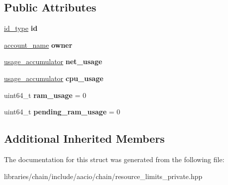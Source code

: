 \subsection*{Public Attributes}
\begin{DoxyCompactItemize}
\item 
\mbox{\label{structaacio_1_1chain_1_1resource__limits_1_1resource__usage__object_af5d3b1e4eff897e8d0ab5c81c0c0506c}} 
\mbox{\hyperlink{classchainbase_1_1oid}{id\+\_\+type}} {\bfseries id}
\item 
\mbox{\label{structaacio_1_1chain_1_1resource__limits_1_1resource__usage__object_a2760b5f0eafc91539ba74032793097d5}} 
\mbox{\hyperlink{structaacio_1_1chain_1_1name}{account\+\_\+name}} {\bfseries owner}
\item 
\mbox{\label{structaacio_1_1chain_1_1resource__limits_1_1resource__usage__object_a37a5582aacbac19fddbb4c99e67eee42}} 
\mbox{\hyperlink{structaacio_1_1chain_1_1resource__limits_1_1impl_1_1exponential__moving__average__accumulator}{usage\+\_\+accumulator}} {\bfseries net\+\_\+usage}
\item 
\mbox{\label{structaacio_1_1chain_1_1resource__limits_1_1resource__usage__object_a462ea31d6513dd9f3a0c10f93e89a854}} 
\mbox{\hyperlink{structaacio_1_1chain_1_1resource__limits_1_1impl_1_1exponential__moving__average__accumulator}{usage\+\_\+accumulator}} {\bfseries cpu\+\_\+usage}
\item 
\mbox{\label{structaacio_1_1chain_1_1resource__limits_1_1resource__usage__object_a8cf51f3562c7c514112f56ec391870dd}} 
uint64\+\_\+t {\bfseries ram\+\_\+usage} = 0
\item 
\mbox{\label{structaacio_1_1chain_1_1resource__limits_1_1resource__usage__object_a28d4b8243e7694844be585afa3acd6ce}} 
uint64\+\_\+t {\bfseries pending\+\_\+ram\+\_\+usage} = 0
\end{DoxyCompactItemize}
\subsection*{Additional Inherited Members}


The documentation for this struct was generated from the following file\+:\begin{DoxyCompactItemize}
\item 
libraries/chain/include/aacio/chain/resource\+\_\+limits\+\_\+private.\+hpp\end{DoxyCompactItemize}

